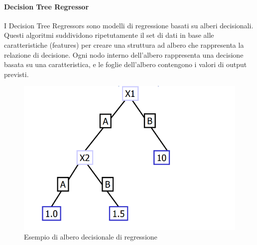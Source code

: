 \paragraph{Decision Tree Regressor}

I Decision Tree Regressors sono modelli di regressione basati su alberi decisionali. Questi algoritmi suddividono ripetutamente il set di dati in base alle caratteristiche (features) per creare una struttura ad albero che rappresenta la relazione di decisione. Ogni nodo interno dell'albero rappresenta una decisione basata su una caratteristica, e le foglie dell'albero contengono i valori di output previsti.
\begin{figure}[H]
    \centering
    \includegraphics[scale=0.5]{images/DecisionTreeRegressor.png}
    \caption{Esempio di albero decisionale di regressione}
\end{figure}

